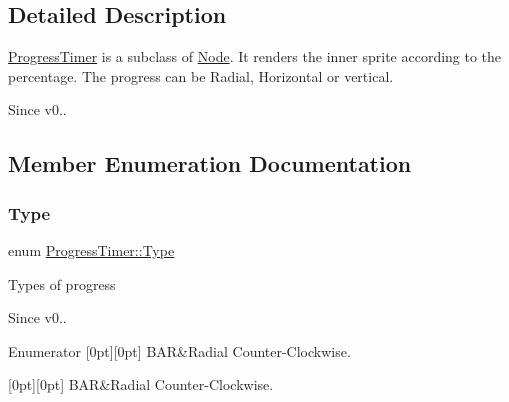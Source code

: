 \subsection{Detailed Description}
\hyperlink{classProgressTimer}{Progress\+Timer} is a subclass of \hyperlink{classNode}{Node}. It renders the inner sprite according to the percentage. The progress can be Radial, Horizontal or vertical. 

\begin{DoxySince}{Since}
v0.. 
\end{DoxySince}


\subsection{Member Enumeration Documentation}
\mbox{\label{classProgressTimer_a9638d092b86d51bce727621b1a70d32f}} 
\subsubsection{\texorpdfstring{Type}{Type}\hspace{0.1cm}{\footnotesize\ttfamily [1/2]}}
{\footnotesize\ttfamily enum \hyperlink{classProgressTimer_a9638d092b86d51bce727621b1a70d32f}{Progress\+Timer\+::\+Type}\hspace{0.3cm}{\ttfamily [strong]}}

Types of progress \begin{DoxySince}{Since}
v0.. 
\end{DoxySince}
\begin{DoxyEnumFields}{Enumerator}
[0pt][0pt]{}\mbox{\label{classProgressTimer_a9638d092b86d51bce727621b1a70d32fa3d75eec709b70a350e143492192a1736}} 
B\+AR&Radial Counter-\/\+Clockwise. \\
\hline

[0pt][0pt]{}\mbox{\label{classProgressTimer_a9638d092b86d51bce727621b1a70d32fa3d75eec709b70a350e143492192a1736}} 
B\+AR&Radial Counter-\/\+Clockwise. \\
\hline

\end{DoxyEnumFields}
\mbox{\label{classProgressTimer_a9638d092b86d51bce727621b1a70d32f}} 
